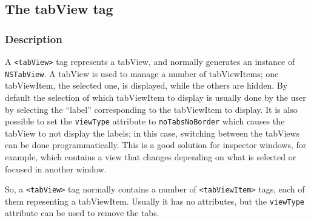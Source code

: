 \subsection{The tabView tag}

\subsubsection{Description}
A \texttt{<tabView>} tag represents a tabView, and normally generates
an instance of \texttt{NSTabView}.  A tabView is used to manage a
number of tabViewItems; one tabViewItem, the selected one, is
displayed, while the others are hidden.  By default the selection of
which tabViewItem to display is usually done by the user by selecting
the ``label'' corresponding to the tabViewItem to display.  It is also
possible to set the \texttt{viewType} attribute to
\texttt{noTabsNoBorder} which causes the tabView to not display the
labels; in this case, switching between the tabViews can be done
programmatically.  This is a good solution for inspector windows, for
example, which contains a view that changes depending on what is
selected or focused in another window.

So, a \texttt{<tabView>} tag normally contains a number of
\texttt{<tabViewItem>} tags, each of them repesenting a tabViewItem.
Usually it has no attributes, but the \texttt{viewType} attribute can
be used to remove the tabs.

